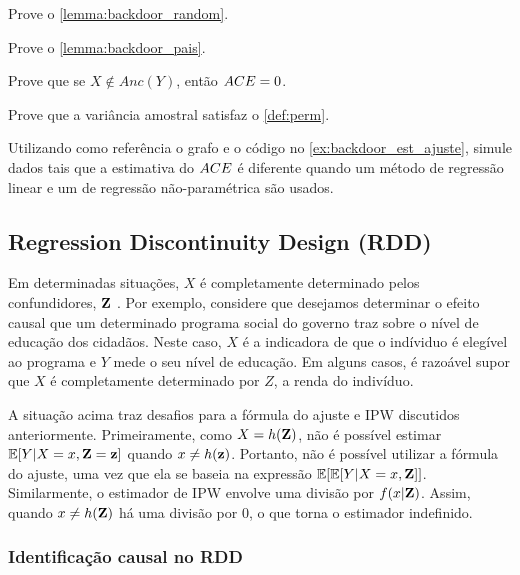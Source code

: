 \begin{exercise}
 Prove o \cref{lemma:backdoor_random}.
\end{exercise}

\begin{exercise}
 Prove o \cref{lemma:backdoor_pais}.
\end{exercise}

\begin{exercise}
 \label{ex:ace_sem_causa}
 Prove que se $X \notin Anc(Y)$, então ${ACE} = 0$.
\end{exercise}

\begin{exercise}
 Prove que a variância amostral satisfaz
 o \cref{def:perm}.
\end{exercise}

\begin{exercise}
 Utilizando como referência o grafo e
 o código no \cref{ex:backdoor_est_ajuste},
 simule dados tais que a estimativa do ${ACE}$ é
 diferente quando um método de regressão linear e
 um de regressão não-paramétrica são usados.
\end{exercise}

\subsection{Regression Discontinuity Design (RDD)}

Em determinadas situações,
$X$ é completamente determinado
pelos confundidores, ${\mathbf{Z}}$ \citep{Lee2010}.
Por exemplo, considere que 
desejamos determinar o efeito causal que
um determinado programa social do governo traz 
sobre o nível de educação dos cidadãos.
Neste caso, $X$ é a indicadora de que
o indíviduo é elegível ao programa e
$Y$ mede o seu nível de educação.
Em alguns casos, é razoável supor que
$X$ é completamente determinado por $Z$,
a renda do indivíduo.

A situação acima traz desafios para
a fórmula do ajuste e IPW discutidos anteriormente.
Primeiramente, como $X = h({\mathbf{Z}})$, 
não é possível estimar ${\mathbb E}[Y|X=x,{\mathbf{Z}}={\mathbf{z}}]$
quando $x \neq h({\mathbf{z}})$.
Portanto, não é possível utilizar
a fórmula do ajuste, uma vez que
ela se baseia na expressão ${\mathbb E}[{\mathbb E}[Y|X=x,{\mathbf{Z}}]]$.
Similarmente, o estimador de IPW envolve
uma divisão por $f(x|{\mathbf{Z}})$.
Assim, quando $x \neq h({\mathbf{Z}})$
há uma divisão por $0$, 
o que torna o estimador indefinido.

\subsubsection{Identificação causal no RDD}

